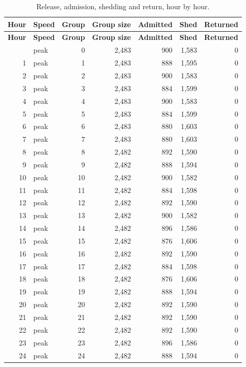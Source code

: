 \documentclass[11pt,a4paper]{article}
\begin{document}
\begin{longtable}{rlrrrrr}
\caption{Release, admission, shedding and return, hour by hour.}\\
\toprule \textbf{Hour} & \textbf{Speed} & \textbf{Group} & \textbf{Group size} & \textbf{Admitted} & \textbf{Shed} & \textbf{Returned} \\ \midrule \endfirsthead
\toprule \textbf{Hour} & \textbf{Speed} & \textbf{Group} & \textbf{Group size} & \textbf{Admitted} & \textbf{Shed} & \textbf{Returned} \\ \midrule \endhead
\bottomrule \endfoot
0 & peak & 0 & 2,483 & 900 & 1,583 & 0 \\
1 & peak & 1 & 2,483 & 888 & 1,595 & 0 \\
2 & peak & 2 & 2,483 & 900 & 1,583 & 0 \\
3 & peak & 3 & 2,483 & 884 & 1,599 & 0 \\
4 & peak & 4 & 2,483 & 900 & 1,583 & 0 \\
5 & peak & 5 & 2,483 & 884 & 1,599 & 0 \\
6 & peak & 6 & 2,483 & 880 & 1,603 & 0 \\
7 & peak & 7 & 2,483 & 880 & 1,603 & 0 \\
8 & peak & 8 & 2,482 & 892 & 1,590 & 0 \\
9 & peak & 9 & 2,482 & 888 & 1,594 & 0 \\
10 & peak & 10 & 2,482 & 900 & 1,582 & 0 \\
11 & peak & 11 & 2,482 & 884 & 1,598 & 0 \\
12 & peak & 12 & 2,482 & 892 & 1,590 & 0 \\
13 & peak & 13 & 2,482 & 900 & 1,582 & 0 \\
14 & peak & 14 & 2,482 & 896 & 1,586 & 0 \\
15 & peak & 15 & 2,482 & 876 & 1,606 & 0 \\
16 & peak & 16 & 2,482 & 892 & 1,590 & 0 \\
17 & peak & 17 & 2,482 & 884 & 1,598 & 0 \\
18 & peak & 18 & 2,482 & 876 & 1,606 & 0 \\
19 & peak & 19 & 2,482 & 888 & 1,594 & 0 \\
20 & peak & 20 & 2,482 & 892 & 1,590 & 0 \\
21 & peak & 21 & 2,482 & 892 & 1,590 & 0 \\
22 & peak & 22 & 2,482 & 892 & 1,590 & 0 \\
23 & peak & 23 & 2,482 & 896 & 1,586 & 0 \\
24 & peak & 24 & 2,482 & 888 & 1,594 & 0 \\

\end{longtable}
\end{document}
